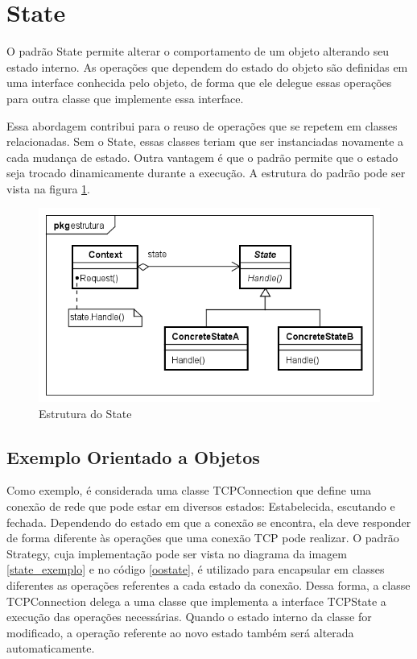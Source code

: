 \section{State}

O padrão State permite alterar o comportamento de um objeto 
alterando seu estado interno. As operações que dependem do 
estado do objeto são definidas em uma interface conhecida 
pelo objeto, de forma que ele delegue essas operações 
para outra classe que implemente essa interface. 

Essa abordagem contribui para o reuso de operações 
que se repetem em classes relacionadas. Sem o State, 
essas classes teriam que ser instanciadas novamente 
a cada mudança de estado. Outra vantagem é que o 
padrão permite que o estado seja trocado dinamicamente 
durante a execução. A estrutura do padrão pode ser 
vista na figura \ref{state_struct}.

\begin{figure}[htb]
	\caption{\label{state_struct}Estrutura do State}
	\begin{center}
	    \includegraphics[scale=0.5]{5_padroes-contexto-funcional/5.3_comportamentais/5.3.08_state/state_estrutura.png}
	\end{center}
\end{figure}

\subsection*{Exemplo Orientado a Objetos}

Como exemplo, é considerada uma classe TCPConnection 
que define uma conexão de rede que pode estar em diversos 
estados: Estabelecida, escutando e fechada. Dependendo 
do estado em que a conexão se encontra, ela deve 
responder de forma diferente às operações que uma 
conexão TCP pode realizar. O padrão Strategy, cuja 
implementação pode ser vista no diagrama da imagem 
\ref{state_exemplo} e no código \ref{oostate}, é 
utilizado para encapsular em classes diferentes as 
operações referentes a cada estado da conexão. 
Dessa forma, a classe TCPConnection delega a uma classe 
que implementa a interface TCPState a execução das 
operações necessárias. Quando o estado interno da classe 
for modificado, a operação referente ao novo estado 
também será alterada automaticamente.


